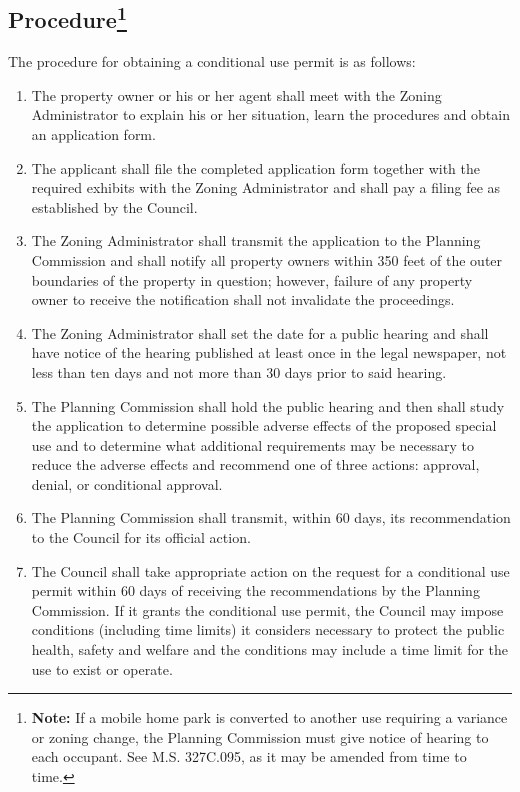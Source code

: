 \subsection{Procedure\footnote{\textbf{Note:} If a mobile home park is converted to another use requiring a variance or zoning change, the Planning Commission must give notice of hearing to each occupant. See M.S. \textsection 327C.095, as it may be amended from time to time.}}
The procedure for obtaining a conditional use permit is as follows:
\begin{enumerate}[{\indent}1)]
    \item The property owner or his or her agent shall meet with the Zoning Administrator to explain his or her situation, learn the procedures and obtain an application form.
    \item The applicant shall file the completed application form together with the required exhibits with the Zoning Administrator and shall pay a filing fee as established by the Council.
    \item The Zoning Administrator shall transmit the application to the Planning Commission and shall notify all property owners within 350 feet of the outer boundaries of the property in question; however, failure of any property owner to receive the notification shall not invalidate the proceedings.
    \item The Zoning Administrator shall set the date for a public hearing and shall have notice of the hearing published at least once in the legal newspaper, not less than ten days and not more than 30 days prior to said hearing.
    \item The Planning Commission shall hold the public hearing and then shall study the application to determine possible adverse effects of the proposed special use and to determine what additional requirements may be necessary to reduce the adverse effects and recommend one of three actions:  approval, denial, or conditional approval.
    \item The Planning Commission shall transmit, within 60 days, its recommendation to the Council for its official action.
    \item The Council shall take appropriate action on the request for a conditional use permit within 60 days of receiving the recommendations by the Planning Commission. If it grants the conditional use permit, the Council may impose conditions (including time limits) it considers necessary to protect the public health, safety and welfare and the conditions may include a time limit for the use to exist or operate.

\end{enumerate}
